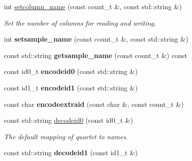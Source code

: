 \begin{DoxyCompactItemize}
\item 
\hypertarget{classprofile_aad49da8a92c55e53c236678a6797323f}{int \hyperlink{classprofile_aad49da8a92c55e53c236678a6797323f}{setcolumn\-\_\-name} (const count\-\_\-t \&, const std\-::string \&)}\label{classprofile_aad49da8a92c55e53c236678a6797323f}

\begin{DoxyCompactList}\small\item\em Set the number of columns for reading and writing. \end{DoxyCompactList}\item 
\hypertarget{classprofile_a46667541ccd87197eb4143311bb38a6e}{int {\bfseries setsample\-\_\-name} (const count\-\_\-t \&, const std\-::string \&)}\label{classprofile_a46667541ccd87197eb4143311bb38a6e}

\item 
\hypertarget{classprofile_ac90c9d2e224e477ea300abf6e86dfd31}{const std\-::string {\bfseries getsample\-\_\-name} (const count\-\_\-t \&) const }\label{classprofile_ac90c9d2e224e477ea300abf6e86dfd31}

\item 
\hypertarget{classprofile_a1cab629668707d2177aeb6eacb7f1502}{const id0\-\_\-t {\bfseries encodeid0} (const std\-::string \&)}\label{classprofile_a1cab629668707d2177aeb6eacb7f1502}

\item 
\hypertarget{classprofile_a01e22b548dda89e55e79822ee0a660bd}{const id1\-\_\-t {\bfseries encodeid1} (const std\-::string \&)}\label{classprofile_a01e22b548dda89e55e79822ee0a660bd}

\item 
\hypertarget{classprofile_a4a0aa1a83451ad94a57d72fd3252bef9}{const char {\bfseries encodeextraid} (const char \&, const count\-\_\-t \&)}\label{classprofile_a4a0aa1a83451ad94a57d72fd3252bef9}

\item 
\hypertarget{classprofile_a082c65eb29e7cb6c936fa109f9b50a4b}{const std\-::string \hyperlink{classprofile_a082c65eb29e7cb6c936fa109f9b50a4b}{decodeid0} (const id0\-\_\-t \&)}\label{classprofile_a082c65eb29e7cb6c936fa109f9b50a4b}

\begin{DoxyCompactList}\small\item\em The default mapping of quartet to names. \end{DoxyCompactList}\item 
\hypertarget{classprofile_ab126d7a10339a3ccb5b26a25bb82868e}{const std\-::string {\bfseries decodeid1} (const id1\-\_\-t \&)}\label{classprofile_ab126d7a10339a3ccb5b26a25bb82868e}


\end{DoxyCompactItemize}
